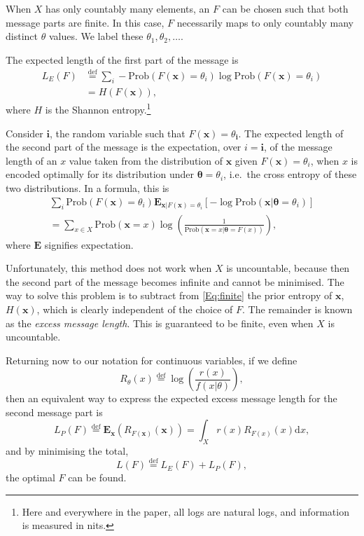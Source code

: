\documentclass{IEEEtran}
\newcommand{\defeq}{\stackrel{\text{def}}{=}}
\begin{document}
When $X$ has only countably many elements, an $F$ can be chosen such that
both message parts are finite. In this case, $F$ necessarily maps to only
countably many distinct $\theta$ values.
We label these $\theta_1,\theta_2,\ldots$.

The expected length of the first part of the message is
\begin{align*}
L_E(F)&\defeq \sum_i -\text{Prob}(F(\mathbf{x})=\theta_i)\log \text{Prob}(F(\mathbf{x})=\theta_i) \\
&= H(F(\mathbf{x})),
\end{align*}
where $H$ is the Shannon entropy.\footnote{Here and everywhere in the paper,
all logs are natural logs, and information is measured in nits.}

Consider $\mathbf{i}$, the random variable such that
$F(\mathbf{x})=\theta_\mathbf{i}$.
The expected length of the second part of the message is the expectation,
over $i=\mathbf{i}$, of the message length of an $x$ value taken from the
distribution of $\mathbf{x}$
given $F(\mathbf{x})=\theta_i$, when $x$ is encoded optimally for its
distribution under $\boldsymbol{\theta}=\theta_i$, i.e.\ the cross entropy of
these two distributions. In a formula, this is
\begin{align}
\sum_i \text{Prob}(F(\mathbf{x})=\theta_i) \mathbf{E}_{\mathbf{x}|F(\mathbf{x})=\theta_i}[-\log \text{Prob}(\mathbf{x}|\boldsymbol{\theta}=\theta_i)] \nonumber\\
=\sum_{x\in X} \text{Prob}(\mathbf{x}=x)\log\left(\frac{1}{\text{Prob}(\mathbf{x}=x|\boldsymbol{\theta}=F(x))}\right),\label{Eq:finite}
\end{align}
where $\mathbf{E}$ signifies expectation.

Unfortunately, this method does not work when $X$ is uncountable, because then
the second part of the message becomes infinite and cannot be minimised. The
way to solve this problem is to subtract from \eqref{Eq:finite} the prior
entropy of $\mathbf{x}$, $H(\mathbf{x})$, which is clearly independent of the
choice of $F$. The remainder is known as the \emph{excess message
length}.
This is guaranteed to be finite, even when $X$ is uncountable.

Returning now to our notation for continuous variables, if we define
\begin{equation}\label{Eq:Rdef}
R_{\theta}(x)\defeq\log\left(\frac{r(x)}{f(x|\theta)}\right),
\end{equation}
then an equivalent way to express the expected excess message length for the
second message part is
\[
L_P(F)\defeq \mathbf{E}_{\mathbf{x}}(R_{F(\mathbf{x})}(\mathbf{x}))=\int_X r(x) R_{F(x)}(x)\text{d}x,
\]
and by minimising the total,
\[
L(F)\defeq L_E(F)+L_P(F),
\]
the optimal $F$ can be found.
\end{document}
